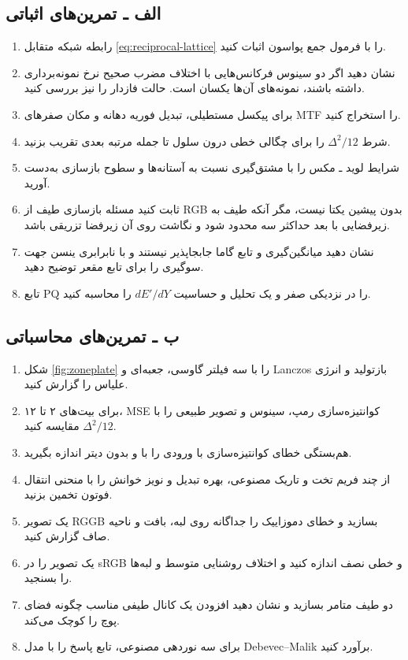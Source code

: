 \subsection*{الف ـ تمرین‌های اثباتی}
\begin{enumerate}
\item رابطه شبکه متقابل \eqref{eq:reciprocal-lattice} را با فرمول جمع پواسون اثبات کنید.
\item نشان دهید اگر دو سینوس فرکانس‌هایی با اختلاف مضرب صحیح نرخ نمونه‌برداری داشته باشند، نمونه‌های
آن‌ها یکسان است. حالت فازدار را نیز بررسی کنید.
\item برای پیکسل مستطیلی، تبدیل فوریه دهانه و مکان صفرهای MTF را استخراج کنید.
\item شرط \(\Delta^2/12\) را برای چگالی خطی درون سلول تا جمله مرتبه بعدی تقریب بزنید.
\item شرایط لوید ـ مکس را با مشتق‌گیری نسبت به آستانه‌ها و سطوح بازسازی به‌دست آورید.
\item ثابت کنید مسئله بازسازی طیف از RGB بدون پیشین یکتا نیست، مگر آنکه طیف به زیر‌فضایی با بعد حداکثر
سه محدود شود و نگاشت روی آن زیر‌فضا تزریقی باشد.
\item نشان دهید میانگین‌گیری و تابع گاما جابجاپذیر نیستند و با نابرابری ینسن جهت سوگیری را برای تابع
مقعر توضیح دهید.
\item تابع PQ را در نزدیکی صفر و یک تحلیل و حساسیت \(dE'/dY\) را محاسبه کنید.
\end{enumerate}

\subsection*{ب ـ تمرین‌های محاسباتی}
\begin{enumerate}
\item شکل \ref{fig:zoneplate} را با سه فیلتر گاوسی، جعبه‌ای و Lanczos بازتولید و انرژی علیاس را گزارش کنید.
\item برای بیت‌های ۲ تا ۱۲، MSE کوانتیزه‌سازی رمپ، سینوس و تصویر طبیعی را با \(\Delta^2/12\) مقایسه کنید.
\item هم‌بستگی خطای کوانتیزه‌سازی با ورودی را با و بدون دیتر اندازه بگیرید.
\item از چند فریم تخت و تاریک مصنوعی، بهره تبدیل و نویز خوانش را با منحنی انتقال فوتون تخمین بزنید.
\item یک تصویر RGGB بسازید و خطای دموزاییک را جداگانه روی لبه، بافت و ناحیه صاف گزارش کنید.
\item یک تصویر را در sRGB و خطی نصف اندازه کنید و اختلاف روشنایی متوسط و لبه‌ها را بسنجید.
\item دو طیف متامر بسازید و نشان دهید افزودن یک کانال طیفی مناسب چگونه فضای پوچ را کوچک می‌کند.
\item برای سه نوردهی مصنوعی، تابع پاسخ را با مدل Debevec--Malik برآورد کنید.
\end{enumerate}

